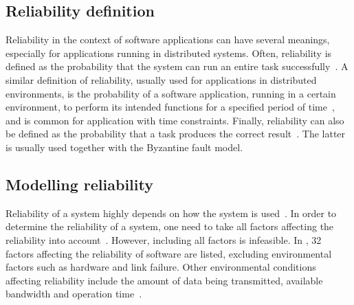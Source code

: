 \documentclass{cslthse-msc}
\begin{document}
\subsection{Reliability definition} \label{subsec:background_reliability_definition}
Reliability in the context of software applications can have several meanings, especially for applications running in distributed systems. Often, reliability is defined as the probability that the system can run an entire task successfully~\cite{taskAllocation, relModelDistSimSystem, studyServiceRel, hierarchicalRelModeling, generalAlgoRelEval, realTimeRelAnalysis, selfAdaptRel, perfRelNonMarkovian}. A similar definition of reliability, usually used for applications in distributed environments, is the probability of a software application, running in a certain environment, to perform its intended functions for a specified period of time~\cite{surveyReliabilityDistr, surveyRelPrediction, relDistApplications}, and is common for application with time constraints. Finally, reliability can also be defined as the probability that a task produces the correct result~\cite{surveyRelPrediction, relAndPerfGridServices, relGridServicePredConstraint, relModelWebServices, selfAdaptRel}. The latter is usually used together with the Byzantine fault model. 

\subsection{Modelling reliability} \label{subsec:background_modelling_rel}
Reliability of a system highly depends on how the system is used~\cite{surveyRelPrediction}. In order to determine the reliability of a system, one need to take all factors affecting the reliability into account~\cite{surveyReliabilityDistr}. However, including all factors is infeasible. In \cite{factorsAffectingRel}, 32 factors affecting the reliability of software are listed, excluding environmental factors such as hardware and link failure. Other environmental conditions affecting reliability include the amount of data being transmitted, available bandwidth and operation time~\cite{cloudServiceRel, hierarchicalRelModeling}.
\end{document}
